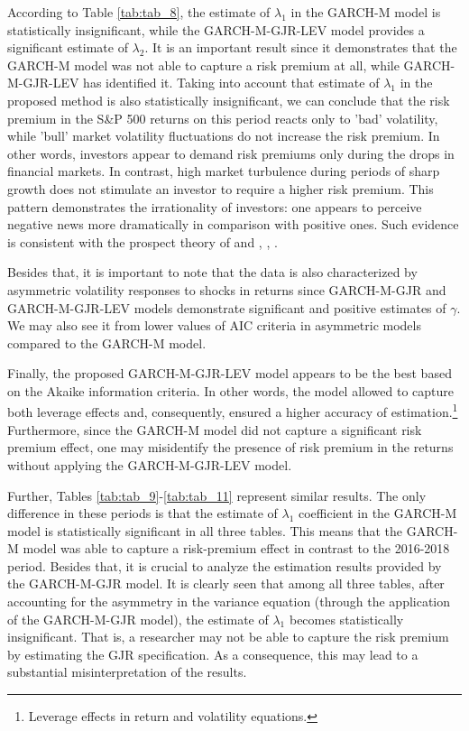 \documentclass[authoryear, 1p]{elsarticle}
\numberwithin{equation}{section}
\begin{document}
According to Table \ref{tab:tab_8}, the estimate of $\lambda_{1}$ in the GARCH-M model is statistically insignificant, while the GARCH-M-GJR-LEV model provides a significant estimate of $\lambda_{2}$. It is an important result since it demonstrates that the GARCH-M model was not able to capture a risk premium at all, while GARCH-M-GJR-LEV has identified it. Taking into account that estimate of $\lambda_{1}$ in the proposed method is also statistically insignificant, we can conclude that the risk premium in the S\&P 500 returns on this period reacts only to 'bad' volatility, while 'bull' market volatility fluctuations do not increase the risk premium. In other words, investors appear to demand risk premiums only during the drops in financial markets. In contrast, high market turbulence during periods of sharp growth does not stimulate an investor to require a higher risk premium. This pattern demonstrates the irrationality of investors: one appears to perceive negative news more dramatically in comparison with positive ones. Such evidence is consistent with the prospect theory of \citep{Kahneman1979} and \citep{Zhang2006}, \citep{Black1976}, \citep{Nelson1991}.


Besides that, it is important to note that the data is also characterized by asymmetric volatility responses to shocks in returns since GARCH-M-GJR and GARCH-M-GJR-LEV models demonstrate significant and positive estimates of $\gamma$. We may also see it from lower values of AIC criteria in asymmetric models compared to the GARCH-M model. 

Finally, the proposed GARCH-M-GJR-LEV model appears to be the best based on the Akaike information criteria. In other words, the model allowed to capture both leverage effects and, consequently, ensured a higher accuracy of estimation.\footnote{Leverage effects in return and volatility equations.} Furthermore, since the GARCH-M model did not capture a significant risk premium effect, one may misidentify the presence of risk premium in the returns without applying the GARCH-M-GJR-LEV model.

Further, Tables \ref{tab:tab_9}-\ref{tab:tab_11} represent similar results. The only difference in these periods is that the estimate of $\lambda_{1}$ coefficient in the GARCH-M model is statistically significant in all three tables. This means that the GARCH-M model was able to capture a risk-premium effect in contrast to the 2016-2018 period. Besides that, it is crucial to analyze the estimation results provided by the GARCH-M-GJR model. It is clearly seen that among all three tables, after accounting for the asymmetry in the variance equation (through the application of the GARCH-M-GJR model), the estimate of $\lambda_{1}$ becomes statistically insignificant. That is, a researcher may not be able to capture the risk premium by estimating the GJR specification. As a consequence, this may lead to a substantial misinterpretation of the results.
\end{document}

